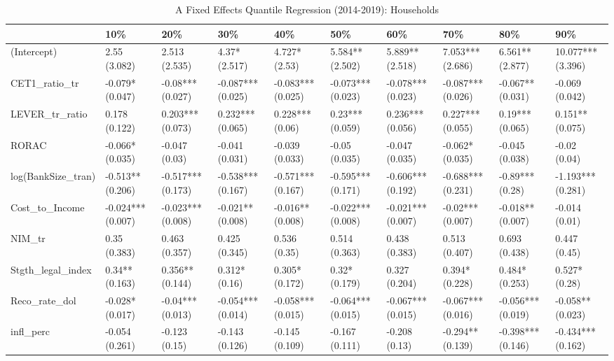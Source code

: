 \begin{table}[ht]
\centering
\caption{A Fixed Effects Quantile Regression (2014-2019): Households} 
\begingroup\small
\begin{tabular}{llllllllll}
  \toprule
 & 10\% & 20\% & 30\% & 40\% & 50\% & 60\% & 70\% & 80\% & 90\% \\ 
  \midrule
(Intercept) & 2.55 (3.082) & 2.513 (2.535) & 4.37* (2.517) & 4.727* (2.53) & 5.584** (2.502) & 5.889** (2.518) & 7.053*** (2.686) & 6.561** (2.877) & 10.077*** (3.396) \\ 
  CET1\_ratio\_tr & -0.079* (0.047) & -0.08*** (0.027) & -0.087*** (0.025) & -0.083*** (0.025) & -0.073*** (0.023) & -0.078*** (0.023) & -0.087*** (0.026) & -0.067** (0.031) & -0.069 (0.042) \\ 
  LEVER\_tr\_ratio & 0.178 (0.122) & 0.203*** (0.073) & 0.232*** (0.065) & 0.228*** (0.06) & 0.23*** (0.059) & 0.236*** (0.056) & 0.227*** (0.055) & 0.19*** (0.065) & 0.151** (0.075) \\ 
  RORAC & -0.066* (0.035) & -0.047 (0.03) & -0.041 (0.031) & -0.039 (0.033) & -0.05 (0.035) & -0.047 (0.035) & -0.062* (0.035) & -0.045 (0.038) & -0.02 (0.04) \\ 
  log(BankSize\_tran) & -0.513** (0.206) & -0.517*** (0.173) & -0.538*** (0.167) & -0.571*** (0.167) & -0.595*** (0.171) & -0.606*** (0.192) & -0.688*** (0.231) & -0.89*** (0.28) & -1.193*** (0.281) \\ 
  Cost\_to\_Income & -0.024*** (0.007) & -0.023*** (0.008) & -0.021** (0.008) & -0.016** (0.008) & -0.022*** (0.008) & -0.021*** (0.007) & -0.02*** (0.007) & -0.018** (0.007) & -0.014 (0.01) \\ 
  NIM\_tr & 0.35 (0.383) & 0.463 (0.357) & 0.425 (0.345) & 0.536 (0.35) & 0.514 (0.363) & 0.438 (0.383) & 0.513 (0.407) & 0.693 (0.438) & 0.447 (0.45) \\ 
  Stgth\_legal\_index & 0.34** (0.163) & 0.356** (0.144) & 0.312* (0.16) & 0.305* (0.172) & 0.32* (0.179) & 0.327 (0.204) & 0.394* (0.228) & 0.484* (0.253) & 0.527* (0.28) \\ 
  Reco\_rate\_dol & -0.028* (0.017) & -0.04*** (0.013) & -0.054*** (0.014) & -0.058*** (0.015) & -0.064*** (0.015) & -0.067*** (0.015) & -0.067*** (0.016) & -0.056*** (0.019) & -0.058** (0.023) \\ 
  infl\_perc & -0.054 (0.261) & -0.123 (0.15) & -0.143 (0.126) & -0.145 (0.109) & -0.167 (0.111) & -0.208 (0.13) & -0.294** (0.139) & -0.398*** (0.146) & -0.434*** (0.162) \\ 

\end{tabular}
\end{table}
